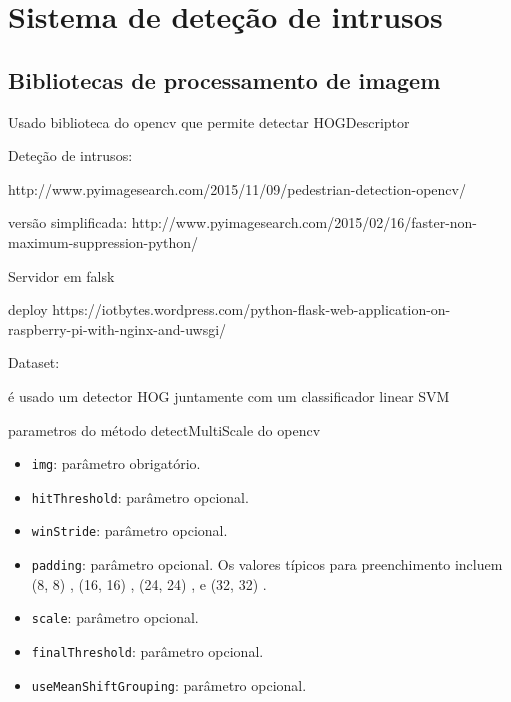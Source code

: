 

\chapter{Sistema de deteção de intrusos}


\section{Bibliotecas de processamento de imagem}


Usado biblioteca do opencv que permite detectar 
HOGDescriptor


Deteção de intrusos: 

http://www.pyimagesearch.com/2015/11/09/pedestrian-detection-opencv/



versão simplificada: http://www.pyimagesearch.com/2015/02/16/faster-non-maximum-suppression-python/



Servidor em falsk 


deploy 
	https://iotbytes.wordpress.com/python-flask-web-application-on-raspberry-pi-with-nginx-and-uwsgi/



Dataset: %


é usado um detector HOG juntamente com um classificador linear SVM 





parametros do método detectMultiScale do opencv 

\begin{itemize}
	\item \texttt{img}: parâmetro obrigatório. 
	\item \texttt{hitThreshold}: parâmetro opcional. 
	\item \texttt{winStride}: parâmetro opcional. 
	\item \texttt{padding}: parâmetro opcional.  Os valores típicos para preenchimento incluem  (8, 8) ,  (16, 16) ,  (24, 24) , e  (32, 32) .
	
		
	\item \texttt{scale}: parâmetro opcional. 
	\item \texttt{finalThreshold}: parâmetro opcional. 
	\item \texttt{useMeanShiftGrouping}: parâmetro opcional. 
\end{itemize}





